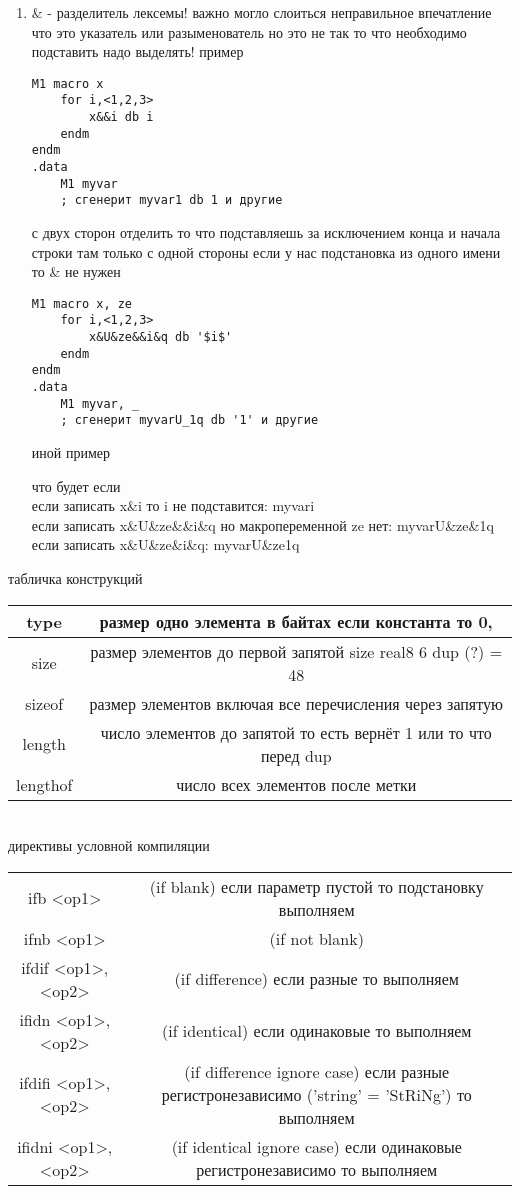 \documentclass[a4paper,10pt]{article}
\begin{document}
\begin{enumerate}
\item \& - разделитель лексемы! важно могло слоиться неправильное впечатление что это указатель или разыменователь но это не так то что необходимо подставить надо выделять! пример \\
\begin{multicols}{2}
\begin{verbatim}
M1 macro x
    for i,<1,2,3>
        x&&i db i
    endm
endm
.data
    M1 myvar
    ; сгенерит myvar1 db 1 и другие
\end{verbatim}
с двух сторон отделить то что подставляешь за исключением конца и начала строки там только с одной стороны если у нас подстановка из одного имени то \& не нужен\\
\columnbreak
\begin{verbatim}
M1 macro x, ze
    for i,<1,2,3>
        x&U&ze&&i&q db '$i$'
    endm 
endm
.data
    M1 myvar, _
    ; сгенерит myvarU_1q db '1' и другие
\end{verbatim}
иной пример
\end{multicols}
что будет если \\
если записать x\&i то i не подставится: myvari \\
если записать x\&U\&ze\&\&i\&q но макропеременной ze нет:  myvarU\&ze\&1q \\
если записать x\&U\&ze\&i\&q: myvarU\&ze1q
\end{enumerate}
\newpage
табличка конструкций \\
\begin{tabular}{|c|c|}
    \hline
        type & размер одно элемента в байтах если константа то 0, \\
    \hline
        size & размер элементов до первой запятой  size real8 6 dup (?) = 48 \\
    \hline
        sizeof & размер элементов включая все перечисления через запятую \\
    \hline
        length & число элементов до запятой то есть вернёт 1 или то что перед dup  \\
    \hline
        lengthof & число всех элементов после метки \\
    \hline
\end{tabular} \\
директивы условной компиляции \\
\begin{tabular}{|c|c|}
    \hline
    ifb <op1>& (if blank) если параметр пустой то подстановку выполняем \\
    ifnb <op1>& (if not blank) \\
    ifdif <op1>, <op2>& (if difference) если разные то выполняем \\
    ifidn <op1>, <op2>& (if identical) если одинаковые то выполняем \\
    ifdifi <op1>, <op2>& (if difference ignore case) если разные регистронезависимо ('string' = 'StRiNg') то выполняем \\
    ifidni <op1>, <op2>& (if identical ignore case) если одинаковые регистронезависимо то выполняем \\
    \hline
\end{tabular} \par
\end{document}
